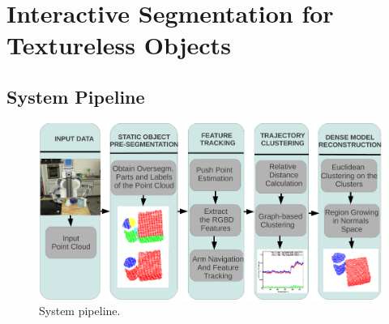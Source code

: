 \chapter{Interactive Segmentation for Textureless Objects}
\label{chapter:Textureless Segmentation}


\section{System Pipeline}

\begin{figure}[h!]
\centering
  \includegraphics[width=\columnwidth]{figures/segmentation_pipeline.pdf}
  \caption{System pipeline.}
  \label{fig:pipeline}
\end{figure}



